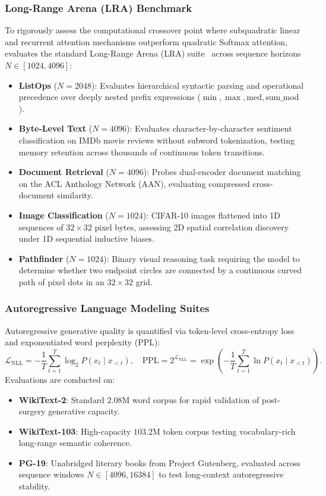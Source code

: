 \subsubsection{Long-Range Arena (LRA) Benchmark}
To rigorously assess the computational crossover point where subquadratic linear and recurrent attention mechanisms outperform quadratic Softmax attention, \neuralops{} evaluates the standard Long-Range Arena (LRA) suite~\cite{tay2020long} across sequence horizons $N \in [1024, 4096]$:
\begin{itemize}
    \item \textbf{ListOps} ($N=2048$): Evaluates hierarchical syntactic parsing and operational precedence over deeply nested prefix expressions ($\min, \max, \text{med}, \text{sum\_mod}$).
    \item \textbf{Byte-Level Text} ($N=4096$): Evaluates character-by-character sentiment classification on IMDb movie reviews without subword tokenization, testing memory retention across thousands of continuous token transitions.
    \item \textbf{Document Retrieval} ($N=4096$): Probes dual-encoder document matching on the ACL Anthology Network (AAN), evaluating compressed cross-document similarity.
    \item \textbf{Image Classification} ($N=1024$): CIFAR-10 images flattened into 1D sequences of $32 \times 32$ pixel bytes, assessing 2D spatial correlation discovery under 1D sequential inductive biases.
    \item \textbf{Pathfinder} ($N=1024$): Binary visual reasoning task requiring the model to determine whether two endpoint circles are connected by a continuous curved path of pixel dots in an $32 \times 32$ grid.
\end{itemize}

\subsubsection{Autoregressive Language Modeling Suites}
Autoregressive generative quality is quantified via token-level cross-entropy loss and exponentiated word perplexity ($\text{PPL}$):
\begin{equation}
\label{eq:perplexity_formula}
\mathcal{L}_{\text{NLL}} = -\frac{1}{T} \sum_{t=1}^{T} \log_2 P(x_t \mid x_{<t}), \quad \text{PPL} = 2^{\mathcal{L}_{\text{NLL}}} = \exp\left( -\frac{1}{T} \sum_{t=1}^{T} \ln P(x_t \mid x_{<t}) \right).
\end{equation}
Evaluations are conducted on:
\begin{itemize}
    \item \textbf{WikiText-2}: Standard $2.08\text{M}$ word corpus for rapid validation of post-surgery generative capacity.
    \item \textbf{WikiText-103}: High-capacity $103.2\text{M}$ token corpus testing vocabulary-rich long-range semantic coherence.
    \item \textbf{PG-19}: Unabridged literary books from Project Gutenberg, evaluated across sequence windows $N \in [4096, 16384]$ to test long-context autoregressive stability.
\end{itemize}

